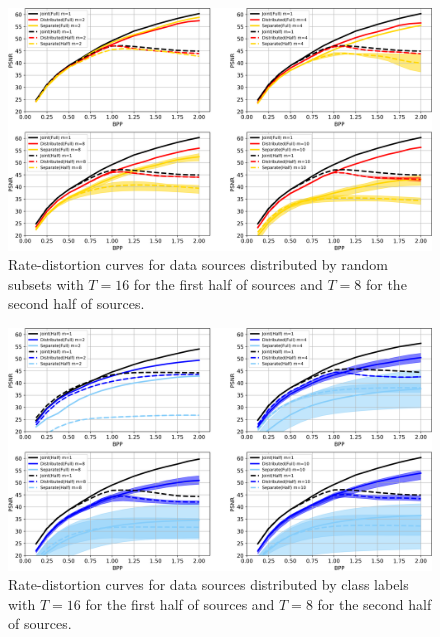 \documentclass[10pt,twocolumn,letterpaper]{article}
\begin{document}
\begin{figure}
\begin{center}
\includegraphics[width=0.8\linewidth]{half_subset_band.png}
\end{center}
	\vspace{-0.2cm}
   \caption{Rate-distortion curves for data sources distributed by random subsets with $T=16$ for the first half of sources and $T=8$ for the second half of sources.}
   \vspace{-0.2cm}
\label{fig_6}
\end{figure}

\begin{figure}
\begin{center}
\includegraphics[width=0.8\linewidth]{half_class_band.png}
\end{center}
	\vspace{-0.2cm}
   \caption{Rate-distortion curves for data sources distributed by class labels with $T=16$ for the first half of sources and $T=8$ for the second half of sources.}
   \vspace{-0.2cm}
\label{fig_7}
\end{figure}
\end{document}
